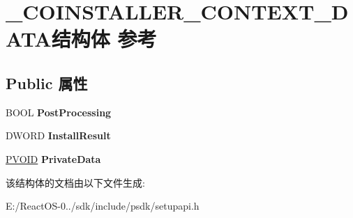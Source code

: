 \hypertarget{struct___c_o_i_n_s_t_a_l_l_e_r___c_o_n_t_e_x_t___d_a_t_a}{}\section{\+\_\+\+C\+O\+I\+N\+S\+T\+A\+L\+L\+E\+R\+\_\+\+C\+O\+N\+T\+E\+X\+T\+\_\+\+D\+A\+T\+A结构体 参考}
\label{struct___c_o_i_n_s_t_a_l_l_e_r___c_o_n_t_e_x_t___d_a_t_a}
\subsection*{Public 属性}
\begin{DoxyCompactItemize}
\item 
\mbox{\label{struct___c_o_i_n_s_t_a_l_l_e_r___c_o_n_t_e_x_t___d_a_t_a_afdb27d51d7e593ad7624e0bcefb375c2}} 
B\+O\+OL {\bfseries Post\+Processing}
\item 
\mbox{\label{struct___c_o_i_n_s_t_a_l_l_e_r___c_o_n_t_e_x_t___d_a_t_a_a7c2e07cd577e1823d337b843057c3316}} 
D\+W\+O\+RD {\bfseries Install\+Result}
\item 
\mbox{\label{struct___c_o_i_n_s_t_a_l_l_e_r___c_o_n_t_e_x_t___d_a_t_a_a760a9ff84e9a6c00f6b15e5c11359bd8}} 
\hyperlink{interfacevoid}{P\+V\+O\+ID} {\bfseries Private\+Data}
\end{DoxyCompactItemize}


该结构体的文档由以下文件生成\+:\begin{DoxyCompactItemize}
\item 
E\+:/\+React\+O\+S-\/0../sdk/include/psdk/setupapi.\+h\end{DoxyCompactItemize}
